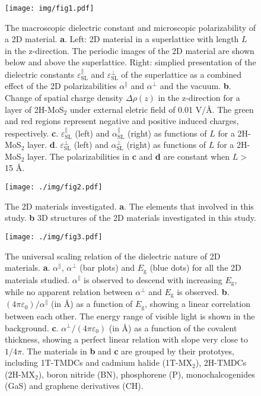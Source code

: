 \documentclass[journal=ancac3,manuscript=article,email=true,hyperref=true,keywords=false]{achemso}
\begin{document}


\label{sec:org34cbe74}
\begin{figure}[htbp]
\centering
\texttt{[image: img/fig1.pdf]}
\caption{\label{fig-1} The macroscopic dielectric constant and
  microscopic polarizability of a 2D material. \textbf{a}. Left: 2D
  material in a superlattice with length $L$ in the z-direction. The
  periodic images of the 2D material are shown below and above the
  superlattice. Right: simplied presentation of the dielectric
  constants $\varepsilon_{\mathrm{SL}}^{\parallel}$ and
  $\varepsilon_{\mathrm{SL}}^{\perp}$ of the superlattice as a
  combined effect of the 2D polarizabilities $\alpha^{\parallel}$ and
  $\alpha^{\perp}$ and the vacuum. \textbf{b}. Change of spatial
  charge density $\Delta \rho(z)$ in the z-direction for a layer of
  2H-MoS$_{2}$ under external eletric field of 0.01 V/\AA{}. The green
  and red regions represent negative and positive induced charges,
  respectively. \textbf{c}. $\varepsilon^{\parallel}_{\mathrm{SL}}$
  (left) and $\alpha_{\mathrm{SL}}^{\parallel}$ (right) as functions
  of $L$ for a 2H-MoS$_{2}$
  layer. \textbf{d}. $\varepsilon^{\perp}_{\mathrm{SL}}$ (left) and
  $\alpha_{\mathrm{SL}}^{\perp}$ (right) as functions of $L$ for a
  2H-MoS$_{2}$ layer. The polarizabilities in \textbf{c} and
  \textbf{d} are constant when $L>$15 \AA{}.}
\end{figure}

\begin{figure}[htbp]
\centering
\texttt{[image: ./img/fig2.pdf]}
\caption{\label{fig-2} The 2D materials investigated. \textbf{a}. The
  elements that involved in this study. \textbf{b} 3D structures of
  the 2D materials investigated in this study.}
\end{figure}

\begin{figure}[htbp]
\centering
\texttt{[image: ./img/fig3.pdf]}
\caption{\label{fig-3} The universal scaling relation of the
  dielectric nature of 2D materials. \textbf{a}. $\alpha^{\parallel}$,
  $\alpha^{\perp}$ (bar plots) and $E_{\mathrm{g}}$ (blue dots) for
  all the 2D materials studied.  $\alpha^{\parallel}$ is observed to
  descend with increasing $E_{\mathrm{g}}$, while no apparent relation
  between $\alpha^{\perp}$ and $E_{\mathrm{g}}$ is
  observed. \textbf{b}. $(4\pi \varepsilon_{0})/\alpha^{\parallel}$
  (in \AA{}) as a function of $E_{\mathrm{g}}$, showing a linear
  correlation between each other. The energy range of visible light is
  shown in the
  background. \textbf{c}. $\alpha^{\perp}/(4\pi\varepsilon_{0})$ (in
  \AA{}) as a function of the covalent thickness, showing a perfect
  linear relation with slope very close to $1/4\pi$. The materials in
  \textbf{b} and \textbf{c} are grouped by their prototyes, including
  1T-TMDCs and cadmium halide (1T-MX$_{2}$), 2H-TMDCs (2H-MX$_{2}$),
  boron nitride (BN), phosphorene (P), monochalcogenides (GaS) and
  graphene derivatives (CH).}
\end{figure}
\end{document}
